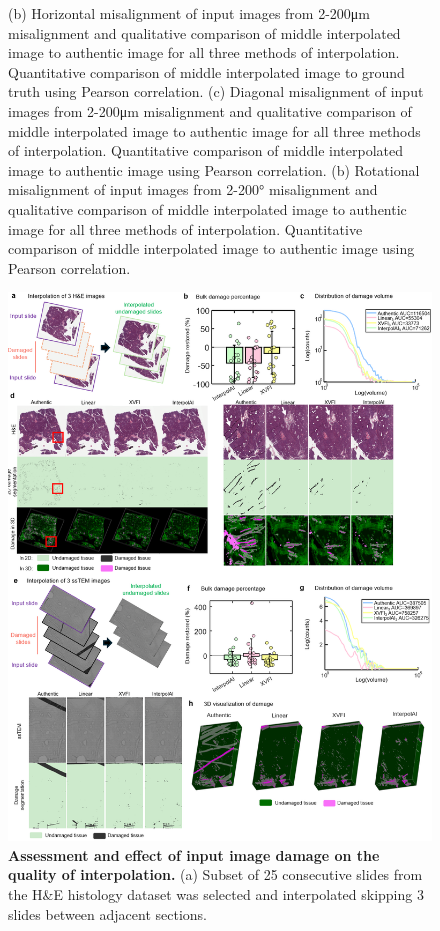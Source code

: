 \begin{refsection}
    \begin{figure}[h!]
        \ContinuedFloat
        \captionsetup{font=small}
        \caption[]{ (b) Horizontal misalignment of input images from 2-200μm misalignment and qualitative comparison of middle interpolated image to authentic image for all three methods of interpolation. Quantitative comparison of middle interpolated image to ground truth using Pearson correlation. (c) Diagonal misalignment of input images from 2-200μm misalignment and qualitative comparison of middle interpolated image to authentic image for all three methods of interpolation. Quantitative comparison of middle interpolated image to authentic image using Pearson correlation. (b) Rotational misalignment of input images from 2-200° misalignment and qualitative comparison of middle interpolated image to authentic image for all three methods of interpolation. Quantitative comparison of middle interpolated image to authentic image using Pearson correlation.}
    \end{figure}

    \begin{figure}[p] 
      \centering
      \includegraphics[width=\linewidth,                   height=0.85\textheight,                   keepaspectratio]{figures/chapter6/fig_S2.png}
      \captionsetup{font=small}
      \caption{\textbf{Assessment and effect of input image damage on the quality of interpolation. }(a) Subset of 25 consecutive slides from the H\&E histology dataset was selected and interpolated skipping 3 slides between adjacent sections.}
      \label{chapter6_figS2}
    \end{figure}
    

\end{refsection}
